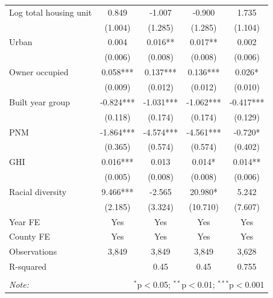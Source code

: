 \documentclass[11pt,twoside,letterpaper]{article}
\begin{document}
\begin{table}[H]
{\begin{tabular}{lcccc}
Log total housing unit & 0.849 & -1.007 & -0.900 & 1.735 \\
 & (1.004) & (1.285) & (1.285) & (1.104) \\
Urban & 0.004 & 0.016** & 0.017** & 0.002 \\
 & (0.006) & (0.008) & (0.008) & (0.006) \\
Owner occupied & 0.058*** & 0.137*** & 0.136*** & 0.026* \\
 & (0.009) & (0.012) & (0.012) & (0.010) \\
Built year group & -0.824*** & -1.031*** & -1.062*** & -0.417*** \\
 & (0.118) & (0.174) & (0.174) & (0.129) \\
PNM & -1.864*** & -4.574*** & -4.561*** & -0.720* \\
 & (0.365) & (0.574) & (0.574) & (0.402) \\
GHI & 0.016*** & 0.013 & 0.014* & 0.014** \\
 & (0.005) & (0.008) & (0.008) & (0.006) \\
Racial diversity & 9.466*** & -2.565 & 20.980* & 5.242 \\
 & (2.185) & (3.324) & (10.710) & (7.607) \\ \hline
Year FE & Yes & Yes & Yes & \multicolumn{1}{c}{Yes} \\
County FE & Yes & Yes & Yes & \multicolumn{1}{c}{Yes} \\
Observations & 3,849 & 3,849 & 3,849 & \multicolumn{1}{c}{3,628} \\
\multicolumn{2}{l}{R-squared} & 0.45 & 0.45 & 0.755 \\ \hline
\hline \\[-1.8ex]
\textit{Note:} & \multicolumn{4}{r}{$^{*}$p$<$0.05; $^{**}$p$<$0.01; $^{***}$p$<$0.001} \\
\end{tabular}}
\end{table}
\end{document}
